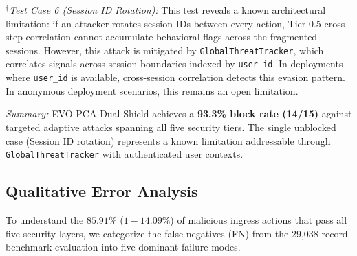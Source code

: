 \documentclass[runningheads]{llncs}
\begin{document}
\textit{$^\dagger$Test Case 6 (Session ID Rotation):} This test reveals a known architectural limitation: if an attacker rotates session IDs between every action, Tier 0.5 cross-step correlation cannot accumulate behavioral flags across the fragmented sessions. However, this attack is mitigated by \texttt{GlobalThreatTracker}, which correlates signals across session boundaries indexed by \texttt{user\_id}. In deployments where \texttt{user\_id} is available, cross-session correlation detects this evasion pattern. In anonymous deployment scenarios, this remains an open limitation.

\textit{Summary:} EVO-PCA Dual Shield achieves a \textbf{93.3\% block rate (14/15)} against targeted adaptive attacks spanning all five security tiers. The single unblocked case (Session ID rotation) represents a known limitation addressable through \texttt{GlobalThreatTracker} with authenticated user contexts.

\subsection{Qualitative Error Analysis}
To understand the $85.91\%$ ($1 - 14.09\%$) of malicious ingress actions that pass all five security layers, we categorize the false negatives (FN) from the 29,038-record benchmark evaluation into five dominant failure modes.

\begin{table}[t]
\caption{Qualitative Failure Mode Analysis of False Negatives (FN)}
\label{tab:error_analysis}
\centering
{}
\end{table}
\end{document}
